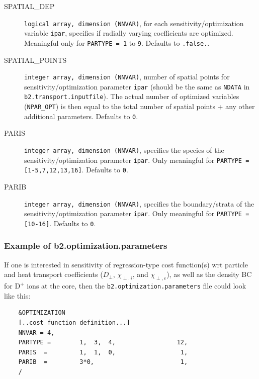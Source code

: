 \begin{sloppypar}
\begin{description}
	\item[SPATIAL\_DEP] {\tt logical array, dimension (NNVAR)}, for each sensitivity/optimization variable {\tt ipar}, specifies if radially varying coefficients are optimized. Meaningful only for {\tt PARTYPE = 1} to {\tt 9}. Defaults to {\tt .false.}.
	\item[SPATIAL\_POINTS] {\tt integer array, dimension (NNVAR)}, number of spatial points for sensitivity/optimization parameter {\tt ipar} (should be the same as {\tt NDATA} in {\tt b2.transport.inputfile}). The actual number of optimized variables ({\tt NPAR\_OPT}) is then equal to the total number of spatial points + any other additional parameters. Defaults to {\tt 0}.
	\item[PARIS] {\tt integer array, dimension (NNVAR)}, specifies the species of the sensitivity/optimization parameter {\tt ipar}. Only meaningful for {\tt PARTYPE = [1-5,7,12,13,16]}. Defaults to {\tt 0}.
	\item[PARIB] {\tt integer array, dimension (NNVAR)}, specifies the boundary/strata of the sensitivity/optimization parameter {\tt ipar}. Only meaningful for {\tt PARTYPE = [10-16]}. Defaults to {\tt 0}.
\end{description}

\subsubsection{Example of b2.optimization.parameters}

If one is interested in sensitivity of regression-type cost function(s) wrt particle and heat transport coefficients ($D_{\perp}$, $\chi_{\perp,i}$, and $\chi_{\perp,e}$), as well as the density BC for $\mathrm{D}^{+}$ ions at the core, then the {\tt b2.optimization.parameters} file could look like this:
\begin{verbatim}
	&OPTIMIZATION
	[..cost function definition...]
	NNVAR = 4,
	PARTYPE =        1,  3,  4,                 12,
	PARIS  =         1,  1,  0,                  1,
	PARIB  =         3*0,                        1,
	/
\end{verbatim}


\end{sloppypar}
